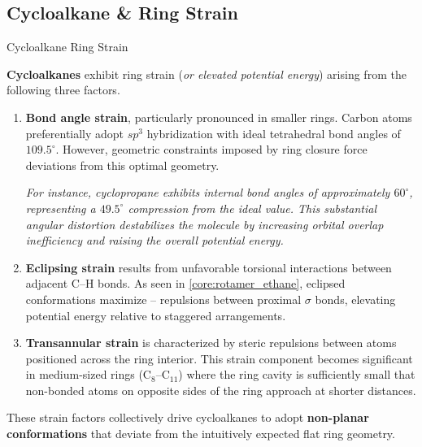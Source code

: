 \documentclass[10pt]{article}
\begin{document}
  \subsection{Cycloalkane \& Ring Strain}

    \begin{core}{Cycloalkane Ring Strain}
   
      \textbf{Cycloalkanes} exhibit ring strain (\textit{or elevated potential energy}) arising from the following three factors.

        \begin{enumerate}

          \item \textbf{Bond angle strain}, particularly pronounced in smaller rings. Carbon atoms preferentially adopt $sp^3$ hybridization with ideal tetrahedral bond angles of $109.5^{\circ}$. However, geometric constraints imposed by ring closure force deviations from this optimal geometry. 

          \textit{For instance, cyclopropane exhibits internal bond angles of approximately $60^{\circ}$, representing a $49.5^{\circ}$ compression from the ideal value. This substantial angular distortion destabilizes the molecule by increasing orbital overlap inefficiency and raising the overall potential energy.}

          \item \textbf{Eclipsing strain} results from unfavorable torsional interactions between adjacent C--H bonds. As seen in \autoref{core:rotamer_ethane}, eclipsed conformations maximize -- repulsions between proximal $\sigma$ bonds, elevating potential energy relative to staggered arrangements.

          \item \textbf{Transannular strain} is characterized by steric repulsions between atoms positioned across the ring interior. This strain component becomes significant in medium-sized rings (C$_8$--C$_{11}$) where the ring cavity is sufficiently small that non-bonded atoms on opposite sides of the ring approach at shorter distances.

        \end{enumerate} 
        
        These strain factors collectively drive cycloalkanes to adopt \textbf{non-planar conformations} that deviate from the intuitively expected flat ring geometry.


    \end{core}
\end{document}
